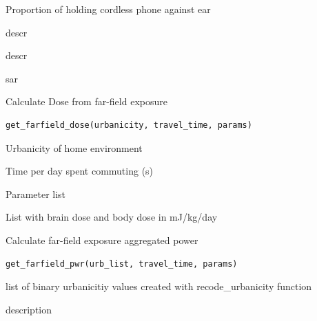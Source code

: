 \documentclass[a4paper]{book}
\begin{document}
%
\begin{Arguments}
\begin{ldescription}
\item[\code{ear\_proportion}] Proportion of holding cordless phone against ear

\item[\code{params}] descr

\item[\code{tissue\_params}] descr
\end{ldescription}
\end{Arguments}
%
\begin{Value}
sar
\end{Value}
%
\begin{Description}
Calculate Dose from far-field exposure
\end{Description}
%
\begin{Usage}
\begin{verbatim}
get_farfield_dose(urbanicity, travel_time, params)
\end{verbatim}
\end{Usage}
%
\begin{Arguments}
\begin{ldescription}
\item[\code{urbanicity}] Urbanicity of home environment

\item[\code{travel\_time}] Time per day spent commuting (s)

\item[\code{params}] Parameter list
\end{ldescription}
\end{Arguments}
%
\begin{Value}
List with brain dose and body dose in mJ/kg/day
\end{Value}
%
\begin{Description}
Calculate far-field exposure aggregated power
\end{Description}
%
\begin{Usage}
\begin{verbatim}
get_farfield_pwr(urb_list, travel_time, params)
\end{verbatim}
\end{Usage}
%
\begin{Arguments}
\begin{ldescription}
\item[\code{urb\_list}] list of binary urbanicitiy values created with recode\_urbanicity
function

\item[\code{params}] description
\end{ldescription}
\end{Arguments}
\end{document}
